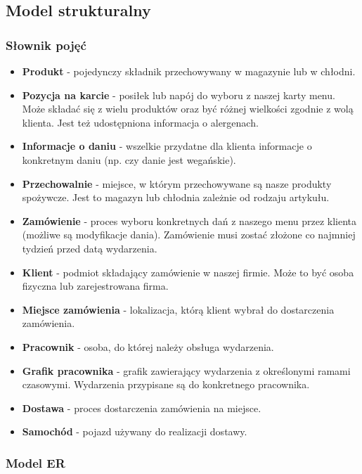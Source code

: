 \documentclass[10pt]{article}
\begin{document}
\subsection{Model strukturalny}

\subsubsection{Słownik pojęć}

\begin{itemize}
    \item \textbf{Produkt} - pojedynczy składnik przechowywany w magazynie lub w chłodni.
    \item \textbf{Pozycja na karcie} - posiłek lub napój do wyboru z naszej karty menu. Może składać się z wielu produktów oraz być różnej wielkości zgodnie z wolą klienta. Jest też udostępniona informacja o alergenach.
    \item \textbf{Informacje o daniu} - wszelkie przydatne dla klienta informacje o konkretnym daniu (np. czy danie jest wegańskie).
    \item \textbf{Przechowalnie} - miejsce, w którym przechowywane są nasze produkty spożywcze. Jest to magazyn lub chłodnia zależnie od rodzaju artykułu.
    \item \textbf{Zamówienie} - proces wyboru konkretnych dań z naszego menu przez klienta (możliwe są modyfikacje dania). Zamówienie musi zostać złożone co najmniej tydzień przed datą wydarzenia.
    \item \textbf{Klient} - podmiot składający zamówienie w naszej firmie. Może to być osoba fizyczna lub zarejestrowana firma.
    \item \textbf{Miejsce zamówienia} - lokalizacja, którą klient wybrał do dostarczenia zamówienia.
    \item \textbf{Pracownik} - osoba, do której należy obsługa wydarzenia.
    \item \textbf{Grafik pracownika} - grafik zawierający wydarzenia z określonymi ramami czasowymi. Wydarzenia przypisane są do konkretnego pracownika.
    \item \textbf{Dostawa} - proces dostarczenia zamówienia na miejsce.
    \item \textbf{Samochód} - pojazd używany do realizacji dostawy.
\end{itemize}

\subsubsection{Model ER}
\end{document}
